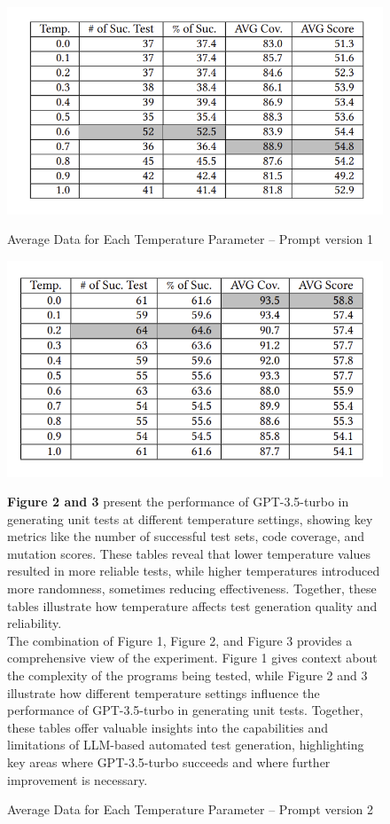 \documentclass[12pt,a4paper]{article}
\begin{document}
\begin{figure}[h]
    \centering
    \includegraphics[width=0.5\linewidth]{table2.png}
    \caption{  Average Data for Each Temperature Parameter – Prompt version 1}
    \label{fig:enter-label}
    \includegraphics[width=0.5\linewidth]{table3.png}
    \caption{  Average Data for Each Temperature Parameter – Prompt version 2}
    \label{fig:enter-label}
    \vspace{1em}
    \textbf{Figure 2 and 3} present the performance of GPT-3.5-turbo in generating unit tests at different temperature settings, showing key metrics like the number of successful test sets, code coverage, and mutation scores. These tables reveal that lower temperature values resulted in more reliable tests, while higher temperatures introduced more randomness, sometimes reducing effectiveness. Together, these tables illustrate how temperature affects test generation quality and reliability.\\
    \vspace{2em}
    \text The combination of Figure 1, Figure 2, and Figure 3 provides a comprehensive view of the experiment. Figure 1 gives context about the complexity of the programs being tested, while Figure 2 and 3 illustrate how different temperature settings influence the performance of GPT-3.5-turbo in generating unit tests. Together, these tables offer valuable insights into the capabilities and limitations of LLM-based automated test generation, highlighting key areas where GPT-3.5-turbo succeeds and where further improvement is necessary.
\end{figure}
\end{document}
